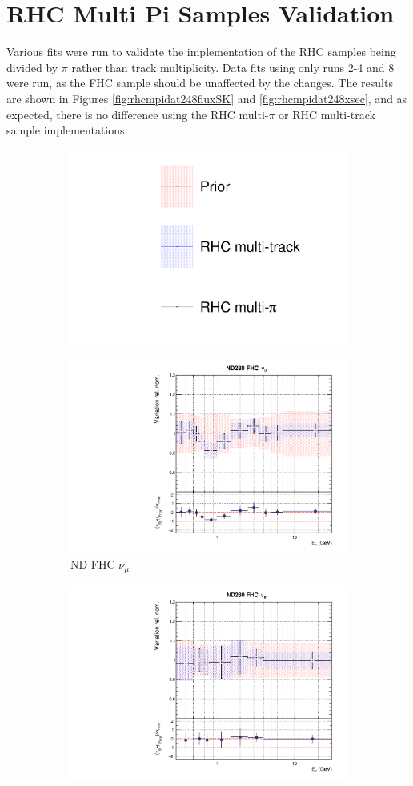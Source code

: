 \chapter{RHC Multi Pi Samples Validation}\label{appendix:rhcmpi}

Various fits were run to validate the implementation of the RHC samples being divided by $\pi$ rather than track multiplicity. Data fits using only runs 2-4 and 8 were run, as the FHC sample should be unaffected by the changes. The results are shown in Figures \ref{fig:rhcmpidat248fluxSK} and \ref{fig:rhcmpidat248xsec}, and as expected, there is no difference using the RHC multi-$\pi$ or RHC multi-track sample implementations. 

\begin{figure}[t]
\centering
\begin{subfigure}{0.95\textwidth}
  \centering
  \includegraphics[width=0.24\linewidth]{figs/rhcmpdat248_leg}	
\end{subfigure}
\begin{subfigure}{0.24\textwidth}
  \centering
  \includegraphics[width=0.95\linewidth]{figs/rhcmpdat248flux_0}
  \caption{ND FHC $\nu_{\mu}$}
\end{subfigure}
\begin{subfigure}{0.24\textwidth}
  \centering
  \includegraphics[width=0.95\linewidth]{figs/rhcmpdat248flux_1}

\end{subfigure}
\end{figure}

